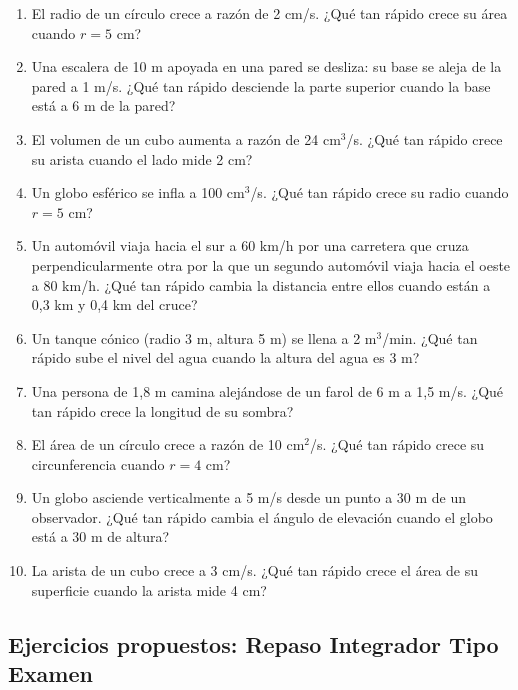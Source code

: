 \documentclass[12pt, letterpaper]{article}
\begin{document}
\begin{enumerate}[resume=ejercicios, leftmargin=*]
  \item \facil{} El radio de un círculo crece a razón de 2 cm/s. ¿Qué tan rápido crece su área cuando $r = 5$ cm?

  \item \medio{} Una escalera de 10 m apoyada en una pared se desliza: su base se aleja de la pared a 1 m/s. ¿Qué tan rápido desciende la parte superior cuando la base está a 6 m de la pared?

  \item \medio{} El volumen de un cubo aumenta a razón de 24 cm$^3$/s. ¿Qué tan rápido crece su arista cuando el lado mide 2 cm?

  \item \medio{} Un globo esférico se infla a 100 cm$^3$/s. ¿Qué tan rápido crece su radio cuando $r = 5$ cm?

  \item \dificil{} Un automóvil viaja hacia el sur a 60 km/h por una carretera que cruza perpendicularmente otra por la que un segundo automóvil viaja hacia el oeste a 80 km/h. ¿Qué tan rápido cambia la distancia entre ellos cuando están a 0{,}3 km y 0{,}4 km del cruce?

  \item \dificil{} Un tanque cónico (radio 3 m, altura 5 m) se llena a 2 m$^3$/min. ¿Qué tan rápido sube el nivel del agua cuando la altura del agua es 3 m?

  \item \dificil{} Una persona de 1{,}8 m camina alejándose de un farol de 6 m a 1{,}5 m/s. ¿Qué tan rápido crece la longitud de su sombra?

  \item \dificil{} El área de un círculo crece a razón de 10 cm$^2$/s. ¿Qué tan rápido crece su circunferencia cuando $r = 4$ cm?

  \item \dificil{} Un globo asciende verticalmente a 5 m/s desde un punto a 30 m de un observador. ¿Qué tan rápido cambia el ángulo de elevación cuando el globo está a 30 m de altura?

  \item \muyDificil{} La arista de un cubo crece a 3 cm/s. ¿Qué tan rápido crece el área de su superficie cuando la arista mide 4 cm?
\end{enumerate}

\subsection{Ejercicios propuestos: Repaso Integrador Tipo Examen}
\end{document}

